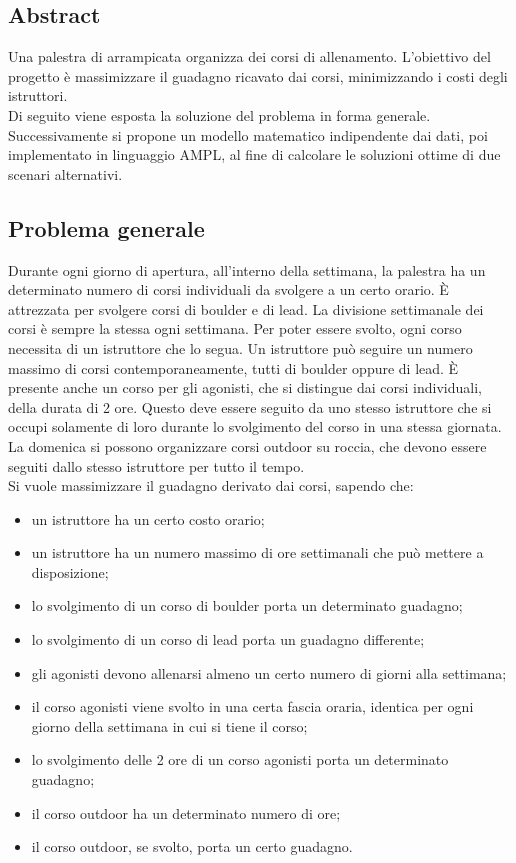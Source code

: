 \subsection{Abstract}
Una palestra di arrampicata organizza dei corsi di allenamento. L'obiettivo del progetto è massimizzare il guadagno ricavato dai corsi, minimizzando i costi degli istruttori. \\
Di seguito viene esposta la soluzione del problema in forma generale. Successivamente si propone un modello matematico indipendente dai dati, poi implementato in linguaggio AMPL, al fine di calcolare le soluzioni ottime di due scenari alternativi.

\subsection{Problema generale}
Durante ogni giorno di apertura, all'interno della settimana, la palestra ha un determinato numero di corsi individuali da svolgere a un certo orario. È attrezzata per svolgere corsi di boulder e di lead. La divisione settimanale dei corsi è sempre la stessa ogni settimana. Per poter essere svolto, ogni corso necessita di un istruttore che lo segua. Un istruttore può seguire un numero massimo di corsi contemporaneamente, tutti di boulder oppure di lead. È presente anche un corso per gli agonisti, che si distingue dai corsi individuali, della durata di 2 ore. Questo deve essere seguito da uno stesso istruttore che si occupi solamente di loro durante lo svolgimento del corso in una stessa giornata. La domenica si possono organizzare corsi outdoor su roccia, che devono essere seguiti dallo stesso istruttore per tutto il tempo. \\
Si vuole massimizzare il guadagno derivato dai corsi, sapendo che:
\begin{itemize}
	\item un istruttore ha un certo costo orario;
	\item un istruttore ha un numero massimo di ore settimanali che può mettere a disposizione;
	\item lo svolgimento di un corso di boulder porta un determinato guadagno;
	\item lo svolgimento di un corso di lead porta un guadagno differente;
	\item gli agonisti devono allenarsi almeno un certo numero di giorni alla settimana;
	\item il corso agonisti viene svolto in una certa fascia oraria, identica per ogni giorno della settimana in cui si tiene il corso;
	\item lo svolgimento delle 2 ore di un corso agonisti porta un determinato guadagno;
	\item il corso outdoor ha un determinato numero di ore;
	\item il corso outdoor, se svolto, porta un certo guadagno.
\end{itemize}
